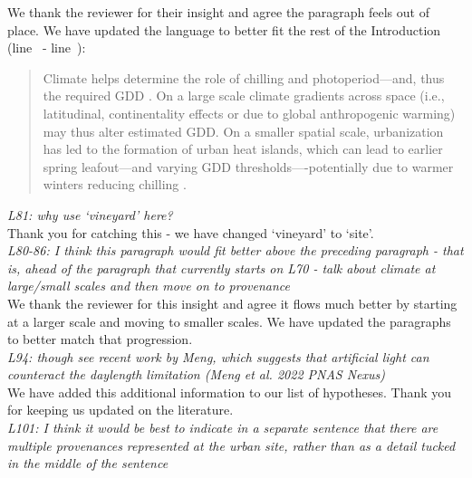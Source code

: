 \documentclass[11pt,a4paper]{article}\usepackage[]{graphicx}\usepackage[]{color}
\newcommand{\lr}[1]{line~\lineref{#1}}
\begin{document}
We thank the reviewer for their insight and agree the paragraph feels out of place. We have updated the language to better fit the rest of the Introduction (\lr{Z4urban} - \lr{Z4urbanend}): \\

\begin{quotation} 
\noindent Climate helps determine the role of chilling and photoperiod---and, thus the required GDD \citep{Bonhomme2000,Wu2022}. On a large scale climate gradients across space (i.e., latitudinal, continentality effects or due to global anthropogenic warming) may thus alter estimated GDD. On a smaller spatial scale, urbanization has led to the formation of urban heat islands, which can  lead to earlier spring leafout---and varying GDD thresholds----potentially due to warmer winters reducing chilling \citep{Meng2020}.
\end{quotation}

\textit{L81: why use `vineyard' here?} \\

Thank you for catching this - we have changed `vineyard' to `site'. \\

\textit{L80-86: I think this paragraph would fit better above the preceding paragraph - that is, ahead of the paragraph that currently starts on L70 - talk about climate at large/small scales and then move on to provenance} \\

We thank the reviewer for this insight and agree it flows much better by starting at a larger scale and moving to smaller scales. We have updated the paragraphs to better match that progression. \\

\textit{L94: though see recent work by Meng, which suggests that artificial light can counteract the daylength limitation (Meng et al. 2022 PNAS Nexus)} \\

We have added this additional information to our list of hypotheses. Thank you for keeping us updated on the literature. \\

\textit{L101: I think it would be best to indicate in a separate sentence that there are multiple provenances represented at the urban site, rather than as a detail tucked in the middle of the sentence} \\
\end{document}
